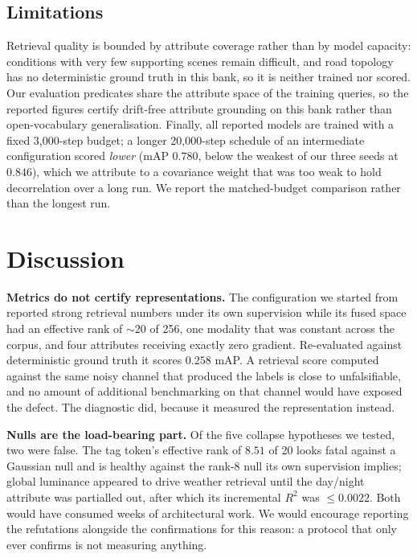 \documentclass[10pt,twocolumn,letterpaper]{article}
\begin{document}
\subsection{Limitations}
Retrieval quality is bounded by attribute coverage rather than by model
capacity: conditions with very few supporting scenes remain difficult, and
road topology has no deterministic ground truth in this bank, so it is
neither trained nor scored. Our evaluation predicates share the attribute
space of the training queries, so the reported figures certify drift-free
attribute grounding on this bank rather than open-vocabulary
generalisation. Finally, all reported models are trained with a fixed
3{,}000-step budget; a longer 20{,}000-step schedule of an intermediate
configuration scored \emph{lower} (mAP $0.780$, below the weakest of our
three seeds at $0.846$), which we attribute to a covariance weight that was
too weak to hold decorrelation over a long run.
We report the matched-budget comparison rather than the longest run.


\section{Discussion}
\label{sec:disc}
\noindent\textbf{Metrics do not certify representations.} The configuration
we started from reported strong retrieval numbers under its own supervision
while its fused space had an effective rank of ${\sim}20$ of 256, one
modality that was constant across the corpus, and four attributes receiving
exactly zero gradient. Re-evaluated against deterministic ground truth it
scores $0.258$ mAP. A retrieval score computed against the same noisy
channel that produced the labels is close to unfalsifiable, and no amount of
additional benchmarking on that channel would have exposed the defect. The
diagnostic did, because it measured the representation instead.

\noindent\textbf{Nulls are the load-bearing part.} Of the five collapse
hypotheses we tested, two were false. The tag token's effective rank of
$8.51$ of 20 looks fatal against a Gaussian null and is healthy against the
rank-8 null its own supervision implies; global luminance appeared to drive
weather retrieval until the day/night attribute was partialled out, after
which its incremental $R^2$ was $\le\!0.0022$. Both would have consumed
weeks of architectural work. We would encourage reporting the refutations
alongside the confirmations for this reason: a protocol that only ever
confirms is not measuring anything.
\end{document}

